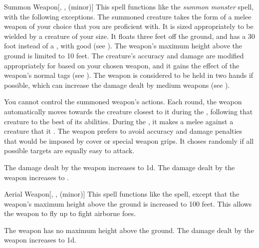 \lowercase{\hypertarget{spell:Summon Weapon}{}}\label{spell:Summon Weapon}
\begin{freeability}[Rank 3]{\hypertarget{spell:Summon Weapon}{Summon Weapon}}[, ,  (minor)]
This spell functions like the \textit{summon monster} spell, with the following exceptions.
The summoned creature takes the form of a melee weapon of your choice that you are proficient with.
It is sized appropriately to be wielded by a creature of your size.
It floats three feet off the ground, and has a 30 foot  instead of a , with good  (see ).
The weapon's maximum height above the ground is limited to 10 feet.
The creature's accuracy and damage are modified appropriately for based on your chosen weapon, and it gains the effect of the weapon's normal tags (see ).
The weapon is considered to be held in two hands if possible, which can increase the damage dealt by medium weapons (see ).

You cannot control the summoned weapon's actions.
Each round, the weapon automatically moves towards the creature closest to it during the , following that creature to the best of its abilities.
During the , it makes a melee  against a creature that it .
The weapon prefers to avoid accuracy and damage penalties that would be imposed by cover or special weapon grips.
It choses randomly if all possible targets are equally easy to attack.

\rankline
{} The damage dealt by the weapon increases to  \minus1d.
 The damage dealt by the weapon increases to .

\end{freeability}
\vspace{0.25em}



\lowercase{\hypertarget{spell:Aerial Weapon}{}}\label{spell:Aerial Weapon}
\begin{freeability}[Rank 4]{\hypertarget{spell:Aerial Weapon}{Aerial Weapon}}[, ,  (minor)]
This spell functions like the  spell, except that the weapon's maximum height above the ground is increased to 100 feet.
This allows the weapon to fly up to fight airborne foes.

\rankline
{} The weapon has no maximum height above the ground.
 The damage dealt by the weapon increases to  \minus1d.

\end{freeability}
\vspace{0.25em}



